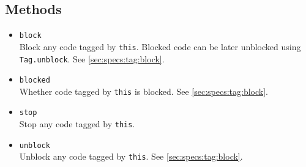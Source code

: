 \subsection{Methods}

\begin{itemize}
\item \lstinline|block|~\\
  Block any code tagged by \lstinline|this|.  Blocked code can be
  later unblocked using \lstinline|Tag.unblock|.  See
  \autoref{sec:specs:tag:block}.

\item \lstinline|blocked|~\\
  Whether code tagged by \lstinline|this| is blocked.  See
  \autoref{sec:specs:tag:block}.

\item \lstinline|stop|~\\
  Stop any code tagged by \lstinline|this|.

\item \lstinline|unblock|~\\
  Unblock any code tagged by \lstinline|this|.  See
  \autoref{sec:specs:tag:block}.
\end{itemize}

